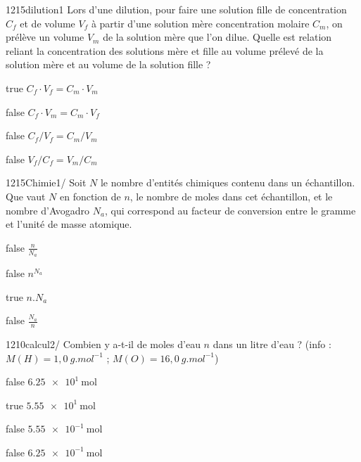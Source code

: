             \begin{question}{1215}{dilution}{1}{}
                Lors d'une dilution, pour faire une solution fille de concentration $C_f$ et de volume $V_f$ à partir d'une solution mère concentration molaire $C_m$, on prélève un volume $V_m$ de la solution mère que l'on dilue. Quelle est relation reliant la concentration des solutions mère et fille au volume prélevé de la solution mère et au volume de la solution fille ?
            \end{question}
            \begin{reponses}
                \item[true] $C_f\cdot V_f = C_m\cdot V_m$
                \item[false] $C_f\cdot V_m = C_m\cdot V_f$
                \item[false] $C_f/V_f = C_m/V_m$
        	    \item[false] $V_f/C_f = V_m/C_m$
            \end{reponses}
            \begin{question}{1215}{Chimie}{1}{/}
    			 Soit $N$ le nombre d'entités chimiques contenu dans un échantillon. Que vaut $N$ en fonction de  $n$, le nombre de moles dans cet échantillon, et le nombre d'Avogadro $N_a$, qui correspond au facteur de conversion entre le gramme et l'unité de masse atomique. 
            \end{question}
            \begin{reponses}
            	\item[false] $ \frac{n}{N_a} $
            	\item[false] $ n^{N_a}$
                \item[true]  $ n.N_a $
                \item[false] $ \frac{N_a}{n} $
            \end{reponses}
		    \begin{question}{1210}{calcul}{2}{/}
				  Combien y a-t-il de moles d'eau $n$ dans un litre d'eau ? (info : $M(H) =1,0\ g.mol^{-1}$ ;  $M(O) = 16,0\ g.mol^{-1}$)
            \end{question}
            \begin{reponses}
            	\item[false] $\SI{6.25e1}{\mol} $
            	\item[true]  $ \SI{5.55e1}{\mol} $
                \item[false] $ \SI{5.55e-1}{\mol} $
                \item[false] $ \SI{6.25e-1}{\mol} $
            \end{reponses}
